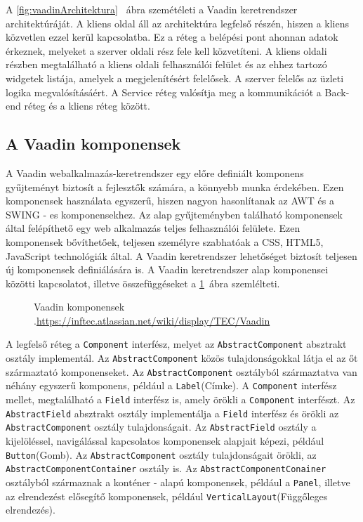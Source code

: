 A \ref{fig:vaadinArchitektura}~ ábra szemétéleti a Vaadin keretrendszer architektúráját.
A kliens oldal áll az architektúra legfelső részén, hiszen a kliens közvetlen ezzel kerül kapcsolatba. Ez a réteg a belépési pont ahonnan adatok érkeznek, melyeket a szerver oldali rész fele kell közvetíteni. A kliens oldali részben megtalálható a kliens oldali felhasználói felület és az ehhez tartozó widgetek listája, amelyek a megjelenítésért felelősek. 
A szerver felelős az üzleti logika megvalósításáért. A Service réteg valósítja meg a kommunikációt a Back-end réteg és a kliens réteg között. 


\subsection{A Vaadin komponensek}\label{sec:Vaadin komponensek}

A Vaadin webalkalmazás-keretrendszer egy előre definiált komponens gyűjteményt biztosít a fejlesztők számára, a könnyebb munka érdekében. Ezen komponensek használata egyszerű, hiszen nagyon hasonlítanak az AWT és a SWING  - es komponensekhez. Az alap gyűjteményben található komponensek által felépíthető egy web alkalmazás teljes felhasználói felülete. Ezen komponensek bővíthetőek, teljesen személyre szabhatóak a CSS, HTML5, JavaScript technológiák által. A Vaadin keretrendszer lehetőséget biztosít teljesen új komponensek definiálására is.
A Vaadin keretrendszer alap komponensei közötti kapcsolatot, illetve összefüggéseket a \ref{fig:vaadinComponents}~ábra szemlélteti. 
\begin{figure}[h!]
  \centering
  \caption[Vaadin keretrendszer komponensei]%
  {Vaadin komponensek\\
  {\white .}\hfill\url{https://inftec.atlassian.net/wiki/display/TEC/Vaadin}}
  \label{fig:vaadinComponents}
\end{figure} 

A legfelső réteg a \texttt{Component} interfész, melyet az \texttt{AbstractComponent} absztrakt osztály implementál. Az \texttt{AbstractComponent} közös tulajdonságokkal látja el az őt származtató komponenseket. Az \texttt{AbstractComponent} osztályból származtatva van néhány egyszerű komponens, például a \texttt{Label}(Címke). A \texttt{Component} interfész mellet, megtalálható a  \texttt{Field} interfész is, amely örökli a \texttt{Component} interfészt. Az \texttt{AbstractField} absztrakt osztály implementálja a  \texttt{Field} interfész és örökli az \texttt{AbstractComponent} osztály tulajdonságait. Az \texttt{AbstractField} osztály a kijelöléssel, navigálással kapcsolatos komponensek alapjait képezi, például \texttt{Button}(Gomb). Az \texttt{AbstractComponent} osztály tulajdonságait örökli, az \texttt{AbstractComponentContainer} osztály is. Az \texttt{AbstractComponentConainer} osztályból származnak a konténer - alapú komponensek, például a  \texttt{Panel}, illetve az elrendezést elősegítő komponensek, például \texttt{VerticalLayout}(Függőleges elrendezés).



